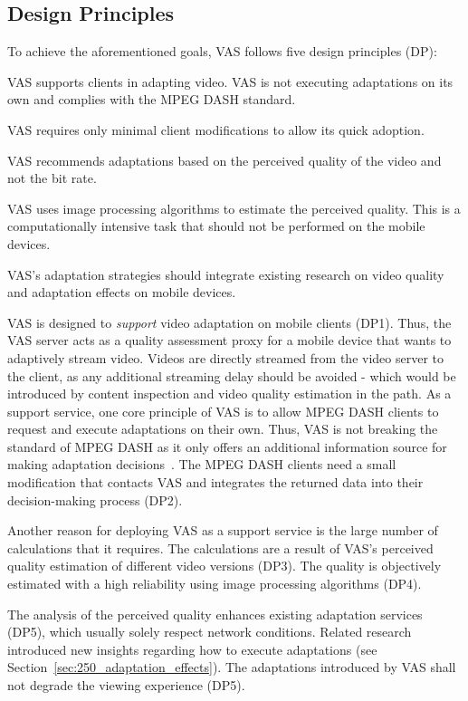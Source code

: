 \subsection{Design Principles}
To achieve the aforementioned goals, \ac{VAS} follows five design principles (DP):
\begin{DesignPrinciples}
	\item \ac{VAS} supports clients in adapting video. \ac{VAS} is not executing adaptations on its own and complies with the \ac{MPEG} \ac{DASH} standard.
	\item \ac{VAS} requires only minimal client modifications to allow its quick adoption.
	\item \ac{VAS} recommends adaptations based on the perceived quality of the video and not the bit rate.
	\item \ac{VAS} uses image processing algorithms to estimate the perceived quality.  
	This is a computationally intensive task that should not be performed on the mobile devices.
	\item \ac{VAS}'s adaptation strategies should integrate existing research on video quality and adaptation effects on mobile devices.
\end{DesignPrinciples}

\ac{VAS} is designed to \emph{support} video adaptation on mobile clients (DP1).
Thus, the \ac{VAS} server acts as a quality assessment proxy for a mobile device that wants to adaptively stream video.
Videos are directly streamed from the video server to the client, as any additional streaming delay should be avoided - which would be introduced by content inspection and video quality estimation in the path. 
As a support service, one core principle of \ac{VAS} is to allow \ac{MPEG} \ac{DASH} clients to request and execute adaptations on their own.
Thus, \ac{VAS} is not breaking the standard of \ac{MPEG} \ac{DASH} as it only offers an additional information source for making adaptation decisions~\cite{Stockhammer2011}.
The \ac{MPEG} \ac{DASH} clients need a small modification that contacts \ac{VAS} and integrates the returned data into their decision-making process (DP2).

Another reason for deploying \ac{VAS} as a support service is the large number of calculations that it requires.
The calculations are a result of \ac{VAS}'s perceived quality estimation of different video versions (DP3).
The quality is objectively estimated with a high reliability using image processing algorithms (DP4).

The analysis of the perceived quality enhances existing adaptation services (DP5), which usually solely respect network conditions.
Related research introduced new insights regarding how to execute adaptations (see Section~\ref{sec:250_adaptation_effects}).
The adaptations introduced by \ac{VAS} shall not degrade the viewing experience (DP5).
